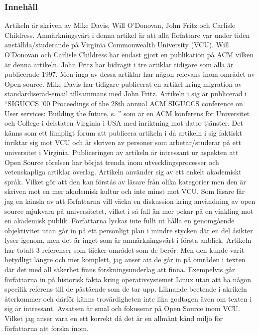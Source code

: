 \documentclass[a4paper]{article}
\begin{document}
\subsubsection{Innehåll}
Artikeln är skriven av Mike Davis, Will O’Donovan, John Fritz och Carlisle Childress. Anmärkningsvärt i denna artikel är att alla författare var under tiden anställda/studerande på Virginia Commonwealth University (VCU). Will O’Donovan och Carlisle Childress har endast gjort en publikation på ACM vilken är denna artikeln. John Fritz har bidragit i tre artiklar tidigare som alla är publicerade 1997. Men inga av dessa artiklar har någon relevans inom området av Open source. Mike Davis har tidigare publicerat en artikel kring migration av standardiserad-email tillsammans med John Fritz. 
Artikeln i sig är publicerad i “SIGUCCS '00 Proceedings of the 28th annual ACM SIGUCCS conference on User services: Building the future, s. ” som är en ACM konferens för Universitet och College i delstaten Virginia i USA med inriktning mot dator tjänster. Det känns som ett lämpligt forum att publicera artikeln i då artikeln i sig faktiskt inriktar sig mot VCU och är skriven av personer som arbetar/studerar på ett universitet i Virginia. Publiceringen av artikeln är intressant ur aspekten att Open Source rörelsen har börjat trenda inom utvecklingsprocesser och vetenskapliga artiklar överlag. Artikeln använder sig av ett enkelt akademiskt språk. Vilket gör att den kan förstås av läsare från olika kategorier men den är skriven mot en mer akademisk kultur och inte minst mot VCU. Som läsare får jag en känsla av att författarna vill väcka en diskussion kring användning av open source mjukvara på universitetet, vilket i så fall än mer pekar på en vinkling mot en akademisk publik. 
Författarna lyckas inte fullt ut hålla en genomgående objektivitet utan går in på ett personligt plan i mindre stycken där en del åsikter lyser igenom, men det är inget som är anmärkningsvärt i första anblick.
Artikeln har totalt 3 referenser som täcker området som de berör. Men den kunde varit betydligt längre och mer komplett, jag anser att de går in på områden i texten där det med all säkerhet finns forskningsunderlag att finna. Exempelvis går författarna in på historisk fakta kring operativsystemet Linux utan att ha någon specifik referens till de påstående som de tar upp. Liknande beetende i akrikeln återkommer och därför känns trovärdigheten inte lika godtagen även om texten i sig är intressant. Avsatsen är smal och fokuserar på Open Source inom VCU. Vilket jag anser vara en ett korrekt då det är en allmänt känd miljö för författarna att forska inom.
\end{document}
